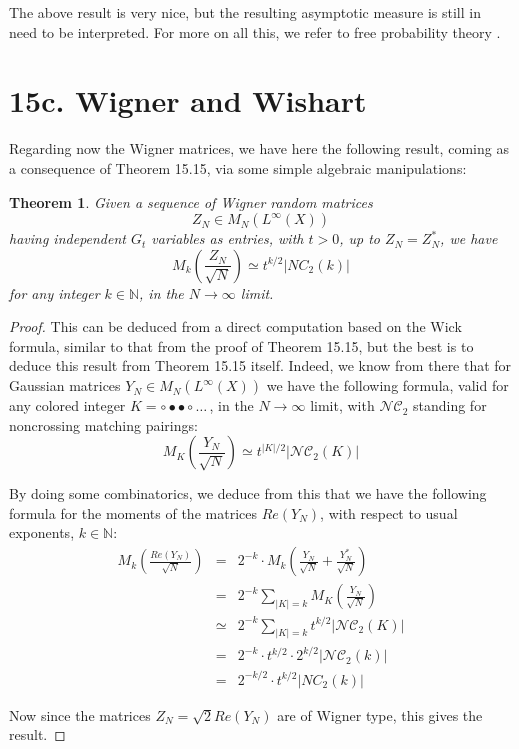 \documentclass[12pt]{amsbook}
\newtheorem{theorem}{Theorem}[chapter]
\begin{document}
The above result is very nice, but the resulting asymptotic measure is still in need to be interpreted. For more on all this, we refer to free probability theory \cite{vdn}.

\section*{15c. Wigner and Wishart}
 
Regarding now the Wigner matrices, we have here the following result, coming as a consequence of Theorem 15.15, via some simple algebraic manipulations:

\begin{theorem}
Given a sequence of Wigner random matrices
$$Z_N\in M_N(L^\infty(X))$$
having independent $G_t$ variables as entries, with $t>0$, up to $Z_N=Z_N^*$, we have
$$M_k\left(\frac{Z_N}{\sqrt{N}}\right)\simeq t^{k/2}|NC_2(k)|$$
for any integer $k\in\mathbb N$, in the $N\to\infty$ limit.
\end{theorem}

\begin{proof}
This can be deduced from a direct computation based on the Wick formula, similar to that from the proof of Theorem 15.15, but the best is to deduce this result from Theorem 15.15 itself. Indeed, we know from there that for Gaussian matrices $Y_N\in M_N(L^\infty(X))$ we have the following formula, valid for any colored integer $K=\circ\bullet\bullet\circ\ldots\,$, in the $N\to\infty$ limit, with $\mathcal{NC}_2$ standing for noncrossing matching pairings:
$$M_K\left(\frac{Y_N}{\sqrt{N}}\right)\simeq t^{|K|/2}|\mathcal{NC}_2(K)|$$

By doing some combinatorics, we deduce from this that we have the following formula for the moments of the matrices $Re(Y_N)$, with respect to usual exponents, $k\in\mathbb N$:
\begin{eqnarray*}
M_k\left(\frac{Re(Y_N)}{\sqrt{N}}\right)
&=&2^{-k}\cdot M_k\left(\frac{Y_N}{\sqrt{N}}+\frac{Y_N^*}{\sqrt{N}}\right)\\
&=&2^{-k}\sum_{|K|=k}M_K\left(\frac{Y_N}{\sqrt{N}}\right)\\
&\simeq&2^{-k}\sum_{|K|=k}t^{k/2}|\mathcal{NC}_2(K)|\\
&=&2^{-k}\cdot t^{k/2}\cdot 2^{k/2}|\mathcal{NC}_2(k)|\\
&=&2^{-k/2}\cdot t^{k/2}|NC_2(k)|
\end{eqnarray*}

Now since the matrices $Z_N=\sqrt{2}Re(Y_N)$ are of Wigner type, this gives the result.
\end{proof}
\end{document}

